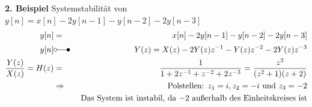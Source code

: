\begin{multicols}{2}
\begin{eqnarray*}
\end{eqnarray*}\\
\vspace{6pt}
\textbf{2. Beispiel} \quad Systemstabilität von $y[n]=x[n]-2y[n-1]-y[n-2]-2y[n-3]$
\begin{eqnarray*}
y[n]&=&x[n]-2y[n-1]-y[n-2]-2y[n-3]\\ y[n] &\laplace& Y(z) = X(z) - 2Y(z)z^{-1}-Y(z)z^{-2}-2Y(z)z^{-3}\\
\frac{Y(z)}{X(z)} = H(z) &=& \frac{1}{1+2z^{-1}+z^{-2}+2z^{-3}} = \frac{z^3}{(z^{2}+1)(z+2)}\\
&\Rightarrow& \text{Polstellen: } z_1 = i, z_2 = -i \text{ und } z_3 = -2 \\
&~&\text{ Das System ist instabil, da $-2$ außerhalb des Einheitskreises ist}
\end{eqnarray*}
\vfill\columnbreak

\end{multicols}
